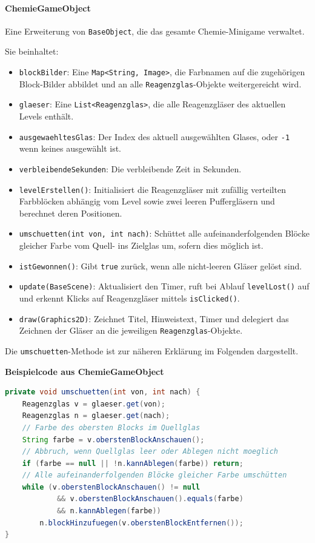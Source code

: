 \paragraph{ChemieGameObject}
Eine Erweiterung von \texttt{BaseObject}, die das gesamte Chemie-Minigame verwaltet.

Sie beinhaltet:
\begin{sloppypar}
    \begin{itemize}
        \item \texttt{blockBilder}: Eine \texttt{Map<String, Image>}, die Farbnamen auf die zugehörigen Block-Bilder abbildet und an alle \texttt{Reagenzglas}-Objekte weitergereicht wird.
        \item \texttt{glaeser}: Eine \texttt{List<Reagenzglas>}, die alle Reagenzgläser des aktuellen Levels enthält.
        \item \texttt{ausgewaehltesGlas}: Der Index des aktuell ausgewählten Glases, oder \texttt{-1} wenn keines ausgewählt ist.
        \item \texttt{verbleibendeSekunden}: Die verbleibende Zeit in Sekunden.
        \item \texttt{levelErstellen()}: Initialisiert die Reagenzgläser mit zufällig verteilten Farbblöcken abhängig vom Level sowie zwei leeren Puffergläsern und berechnet deren Positionen.
        \item \texttt{umschuetten(int von, int nach)}: Schüttet alle aufeinanderfolgenden Blöcke gleicher Farbe vom Quell- ins Zielglas um, sofern dies möglich ist.
        \item \texttt{istGewonnen()}: Gibt \texttt{true} zurück, wenn alle nicht-leeren Gläser gelöst sind.
        \item \texttt{update(BaseScene)}: Aktualisiert den Timer, ruft bei Ablauf \texttt{levelLost()} auf und erkennt Klicks auf Reagenzgläser mittels \texttt{isClicked()}.
        \item \texttt{draw(Graphics2D)}: Zeichnet Titel, Hinweistext, Timer und delegiert das Zeichnen der Gläser an die jeweiligen \texttt{Reagenzglas}-Objekte.
    \end{itemize}
\end{sloppypar}

Die \texttt{umschuetten}-Methode ist zur näheren Erklärung im Folgenden dargestellt.

\textbf{Beispielcode aus ChemieGameObject}
\begin{lstlisting}[caption=umschuetten-Methode, label=lst:mgumschuetten, captionpos=t, language=Java]
private void umschuetten(int von, int nach) {
    Reagenzglas v = glaeser.get(von);
    Reagenzglas n = glaeser.get(nach);
    // Farbe des obersten Blocks im Quellglas
    String farbe = v.oberstenBlockAnschauen();
    // Abbruch, wenn Quellglas leer oder Ablegen nicht moeglich
    if (farbe == null || !n.kannAblegen(farbe)) return;
    // Alle aufeinanderfolgenden Blöcke gleicher Farbe umschütten
    while (v.oberstenBlockAnschauen() != null
            && v.oberstenBlockAnschauen().equals(farbe)
            && n.kannAblegen(farbe))
        n.blockHinzufuegen(v.oberstenBlockEntfernen());
}
\end{lstlisting}

